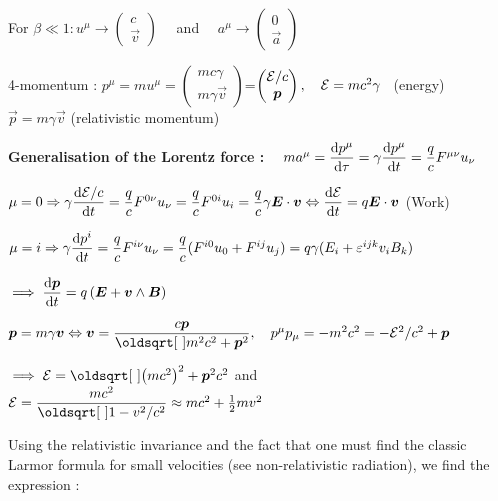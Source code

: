 \item For $\beta \ll 1 : u^{\mu} \rightarrow 
\begin{pmatrix}
c\\
\vec{v}
\end{pmatrix} \quad $ and $ \quad a^{\mu} \rightarrow
\begin{pmatrix}
0\\
\vec{a}
\end{pmatrix}$


\item 4-momentum : $p^{\mu} = m u^{\mu}= 
\begin{pmatrix}
    mc\gamma \\
    m\gamma \Vec{v}
\end{pmatrix}$=$\begin{pmatrix}
    \E/c \\
    \Vec{p}
\end{pmatrix}, \quad \E = mc^2\gamma $ \ (energy) \ $\vec{p} = m\gamma \Vec{v}$ (relativistic momentum)


\item[] \textbf{Generalisation of the Lorentz force :} $\quad ma^{\mu} = \dfrac{\textrm{d} p^\mu}{\textrm{d} \tau} = \gamma\dfrac{\textrm{d} p^\mu}{\textrm{d} t} = \dfrac{q}{c} F^{\mu\nu}u_{\nu}$

\item $\mu = 0 \Rightarrow \gamma\dfrac{\ud \E/c}{\ud t} = \dfrac{q}{c} F^{0\nu}u_{\nu}= \dfrac{q}{c} F^{0i}u_{i} = \dfrac{q}{c}\gamma\Vec{E}\cdot\Vec{v} \Leftrightarrow \dfrac{\ud \E}{\ud t}= q\Vec{E}\cdot\Vec{v}$ \quad (Work)  

\item $\mu = i \Rightarrow \gamma\dfrac{\textrm{d} p^i}{\textrm{d} t} = \dfrac{q}{c} F^{i\nu}u_{\nu} = \dfrac{q}{c} (F^{i0}u_{0} +F^{ij}u_{j})= q\gamma(E_i + \varepsilon^{ijk}v_iB_k)$

$ \implies \dfrac{\ud \Vec{p} }{\ud t}  = q\left(\vec{E} + \vec{v} \wedge \vec{B} \right)$


\item $\vec{p} = m\gamma\vec{v} \Leftrightarrow \vec{v} = \dfrac{c\vec{p}}{\sqrt{m^2c^2 + \vec{p}^2}}, \quad p^{\mu}p_{\mu} = -m^2c^2 = -\E^2/c^2 +\Vec{p}$

$ \implies \E = \sqrt{\left(mc^2\right)^2 + \vec{p}^2c^2}$ \quad and \quad $\E = \dfrac{mc^2}{\sqrt{1-v^2/c^2}} \approx mc^2 + \half mv^2$  

\squishend
{}
\squishlist
\item[] Using the relativistic invariance and the fact that one must find the classic Larmor formula for small velocities (see non-relativistic radiation), we find the expression :


